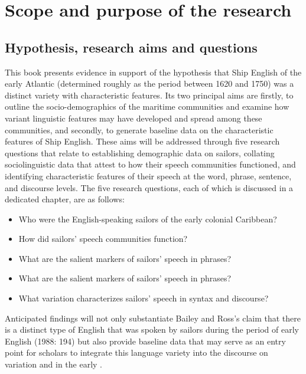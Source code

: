 \section{{Scope} {and} {purpose} {of} {the} {research}  }%



\subsection{{Hypothesis,} {research} {aims} {and} {questions}}%



This book presents evidence in support of the hypothesis that Ship English of the early Atlantic  (determined roughly as the period between 1620 and 1750) was a distinct variety with characteristic features. Its two principal aims are firstly, to outline the socio-demographics of the maritime communities and examine how variant linguistic features may have developed and spread among these communities, and secondly, to generate baseline data on the characteristic features of Ship English. These aims will be addressed through five research questions that relate to establishing demographic data on sailors, collating sociolinguistic data that attest to how their speech communities functioned, and identifying characteristic features of their speech at the word, phrase, sentence, and discourse levels. The five research questions, each of which is discussed in a dedicated chapter, are as follows:


\begin{itemize}
\item Who were the English-speaking sailors of the early colonial Caribbean?
\item How did sailors’ speech communities function?
\item What are the salient markers of sailors’ speech in  phrases?
\item What are the salient markers of sailors’ speech in  phrases?
\item What variation characterizes sailors’ speech in syntax and discourse?
\end{itemize}

Anticipated findings will not only substantiate Bailey and Ross’s claim that there is a distinct type of English that was spoken by sailors during the period of early English  (1988: 194) but also provide baseline data that may serve as an entry point for scholars to integrate this language variety into the discourse on  variation and  in the early . 


